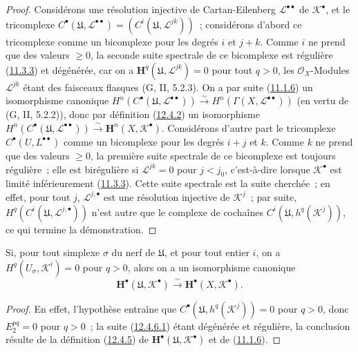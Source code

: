 \begin{proof}
Considérons une résolution injective de Cartan-Eilenberg
$\mathcal L^{\bullet\bullet}$ de $\mathcal K^\bullet$, et le tricomplexe
$C^\bullet(\mathfrak U,\mathcal L^{\bullet\bullet})
=(C^i(\mathfrak U,\mathcal L^{jk}))$~; considérons d'abord ce
tricomplexe comme un bicomplexe pour les degrés $i$ et $j+k$. Comme $i$ ne
prend que des valeurs $\geq0$, la seconde suite spectrale de ce bicomplexe
est régulière (\hyperref[0.11.3.3-fr]{11.3.3}) et dégénérée, car on a
$\mathbf H^q(\mathfrak U,\mathcal L^{jk})=0$ pour tout $q>0$, les
$\mathcal O_X$-Modules $\mathcal L^{jk}$ étant des faisceaux
flasques (G, II, 5.2.3). On a par suite
(\hyperref[0.11.1.6-fr]{11.1.6}) un isomorphisme canonique
$H^n(C^\bullet(\mathfrak U,\mathcal L^{\bullet\bullet}))\xrightarrow{\sim}H^n(\Gamma(X,\mathcal L^{\bullet\bullet}))$
(en vertu de (G, II, 5.2.2)), donc par définition
(\hyperref[0.12.4.2-fr]{12.4.2}) un isomorphisme
$H^n(C^\bullet(\mathfrak U,\mathcal L^{\bullet\bullet}))\xrightarrow{\sim}\mathbf H^n(X,\mathcal K^\bullet)$.
Considérons d'autre part le tricomplexe
$C^\bullet(U,L^{\bullet\bullet})$ comme un
bicomplexe pour les degrés $i+j$ et $k$. Comme $k$ ne prend que des valeurs
$\geq0$, la première suite spectrale de ce bicomplexe est toujours
régulière~; elle est birégulière si $\mathcal L^{jk}=0$ pour $j<j_0$,
c'est-à-dire lorsque $\mathcal K^\bullet$ est limité inférieurement
(\hyperref[0.11.3.3-fr]{11.3.3}). Cette suite spectrale est la suite
cherchée~; en effet, pour tout $j$, $\mathcal L^{j,\bullet}$ est une
résolution injective de $\mathcal K^j$~; par suite,
$H^q(C^i(\mathfrak U,\mathcal L^{j,\bullet}))$ n'est autre que le
complexe de cochaînes
$C^i(\mathfrak U,h^q(\mathcal K^j))$, ce qui termine la
démonstration.
\end{proof}

\begin{corollary}[12.4.7]
\label{0.12.4.7-fr}
Si, pour tout simplexe $\sigma$ du nerf de $\mathfrak U$, et pour
tout entier $i$, on a
$H^q(U_\sigma,\mathcal K^i)=0$ pour $q>0$, alors on a un isomorphisme
canonique
\begin{equation}
\label{0.12.4.7.1-fr}
\tag{12.4.7.1}
\mathbf H^\bullet(\mathfrak U,\mathcal K^\bullet)
\xrightarrow{\sim}\mathbf H^\bullet(X,\mathcal K^\bullet).
\end{equation}
\end{corollary}

\begin{proof}
En effet, l'hypothèse entraîne que
$C^\bullet(\mathfrak U,h^q(\mathcal K^j))=0$ pour $q>0$, donc
$E_2^{pq}=0$ pour $q>0$~; la suite
(\hyperref[0.12.4.6.1-fr]{12.4.6.1}) étant dégénérée et régulière, la
conclusion résulte de la définition
(\hyperref[0.12.4.5-fr]{12.4.5}) de
$\mathbf H^\bullet(\mathfrak U,\mathcal K^\bullet)$ et de
(\hyperref[0.11.1.6-fr]{11.1.6}).
\end{proof}

